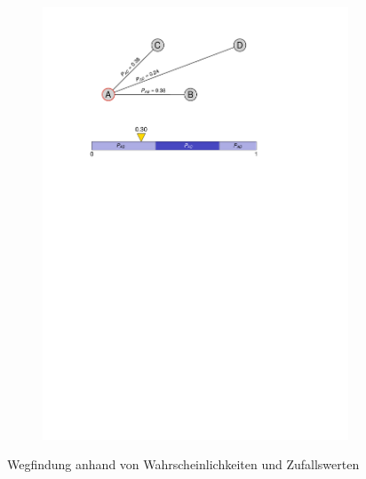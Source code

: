 \documentclass[pdftex,
               12pt,
               DIV=12,
               a4paper,
               twoside,
               parskip=half,
               abstract=true,
               dvipsnames]{scrartcl}
\begin{document}
\begin{figure}[ht]
\begin{subfigure}{0.55\textwidth}
		\includegraphics[width=\linewidth, page=3, trim=0 100 0 0, clip]{aco_probabilities}
		\caption{} \label{subfig:ACO_wahrscheinlichkeiten_c}
	\end{subfigure}
	\caption{Wegfindung anhand von Wahrscheinlichkeiten und Zufallswerten}
\end{figure}
\end{document}
